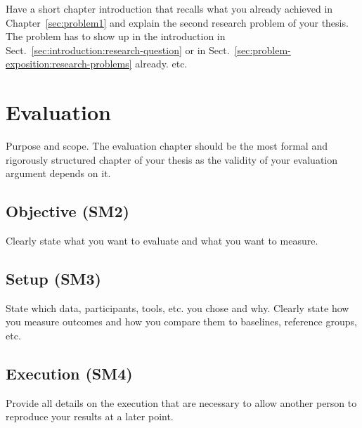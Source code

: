 \documentclass[12pt,a4paper,footinclude=true,twoside,headinclude=true]{report}
\begin{document}
Have a short chapter introduction that recalls what you already achieved in Chapter~\ref{sec:problem1} and explain the second research problem of your thesis. The problem has to show up in the introduction in Sect.~\ref{sec:introduction:research-question} or in Sect.~\ref{sec:problem-exposition:research-problems} already. etc.

\chapter{Evaluation}\label{sec:evaluation}

\textsf{Purpose and scope}. The evaluation chapter should be the most formal and rigorously structured chapter of your thesis as the validity of your evaluation argument depends on it.

\section{Objective (SM2)}\label{sec:evaluation:objective}

Clearly state what you want to evaluate and what you want to measure.

\section{Setup (SM3)}\label{sec:evaluation:setup}

State which data, participants, tools, etc. you chose and why. Clearly state how you measure outcomes and how you compare them to baselines, reference groups, etc.

\section{Execution (SM4)}\label{sec:evaluation:execution}

Provide all details on the execution that are necessary to allow another person to reproduce your results at a later point.
\end{document}
